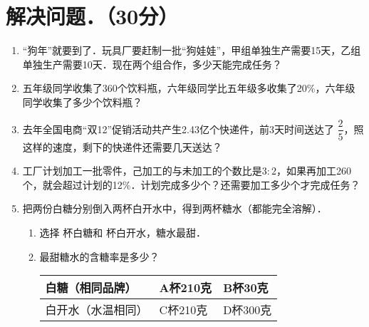 \documentclass[12pt,twoside,space]{ctexart}
\begin{document}
    \section{解决问题．（30分）}
      \begin{enumerate}[itemsep=4em,topsep=0pt]
        \item “狗年”就要到了．玩具厂要赶制一批“狗娃娃”，甲组单独生产需要15天，乙组单独生产需要10天．现在两个组合作，多少天能完成任务？
        \item 五年级同学收集了360个饮料瓶，六年级同学比五年级多收集了20\%，六年级同学收集了多少个饮料瓶？
        \item 去年全国电商“双12”促销活动共产生2.43亿个快递件，前3天时间送达了 $\dfrac{2}{5}$，照这样的速度，剩下的快递件还需要几天送达？
        \item 工厂计划加工一批零件，己加工的与未加工的个数比是$3:2$，如果再加工260个，就会超过计划的12\%．计划完成多少个？还需要加工多少个才完成任务？
        \item 把两份白糖分别倒入两杯白开水中，得到两杯糖水（都能完全溶解）．
          \begin{enumerate}[align=left,labelsep=-0.6em,leftmargin=1.2em,noitemsep,topsep=0pt,label={(\arabic*)}]
            \item 选择 \underline{\hspace{2em}} 杯白糖和 \underline{\hspace{2em}} 杯白开水，糖水最甜．
            \item 最甜糖水的含糖率是多少？\\[0.5em]
              \begin{tabular}{|l|l|l|}
              \hline
              白糖（相同品牌） & A杯210克 & B杯30克 \\ \hline
              白开水（水温相同） & C杯210克 & D杯300克 \\ \hline
              \end{tabular}

          \end{enumerate}
      \end{enumerate}
\end{document}
